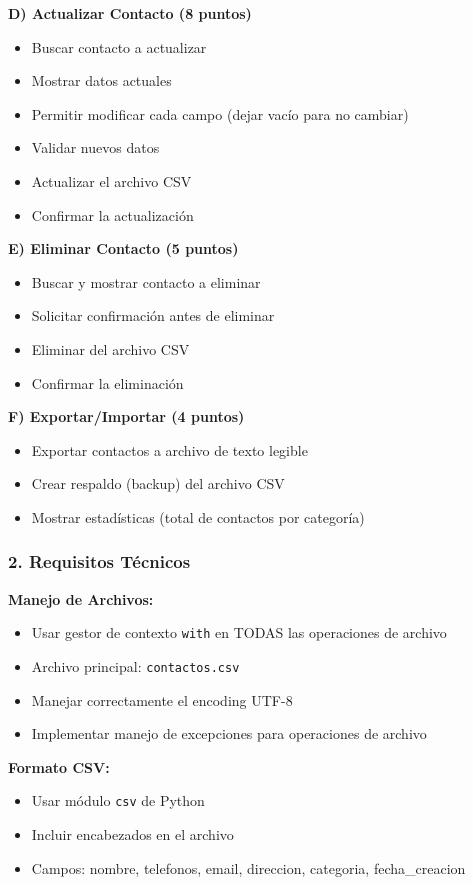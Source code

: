\documentclass[11pt,letterpaper]{article}
\begin{document}
\textbf{D) Actualizar Contacto (8 puntos)}
\begin{itemize}
    \item Buscar contacto a actualizar
    \item Mostrar datos actuales
    \item Permitir modificar cada campo (dejar vacío para no cambiar)
    \item Validar nuevos datos
    \item Actualizar el archivo CSV
    \item Confirmar la actualización
\end{itemize}

\textbf{E) Eliminar Contacto (5 puntos)}
\begin{itemize}
    \item Buscar y mostrar contacto a eliminar
    \item Solicitar confirmación antes de eliminar
    \item Eliminar del archivo CSV
    \item Confirmar la eliminación
\end{itemize}

\textbf{F) Exportar/Importar (4 puntos)}
\begin{itemize}
    \item Exportar contactos a archivo de texto legible
    \item Crear respaldo (backup) del archivo CSV
    \item Mostrar estadísticas (total de contactos por categoría)
\end{itemize}

\subsubsection{2. Requisitos Técnicos}

\textbf{Manejo de Archivos:}
\begin{itemize}
    \item Usar gestor de contexto \texttt{with} en TODAS las operaciones de archivo
    \item Archivo principal: \texttt{contactos.csv}
    \item Manejar correctamente el encoding UTF-8
    \item Implementar manejo de excepciones para operaciones de archivo
\end{itemize}

\textbf{Formato CSV:}
\begin{itemize}
    \item Usar módulo \texttt{csv} de Python
    \item Incluir encabezados en el archivo
    \item Campos: nombre, telefonos, email, direccion, categoria, fecha\_creacion
\end{itemize}
\end{document}
